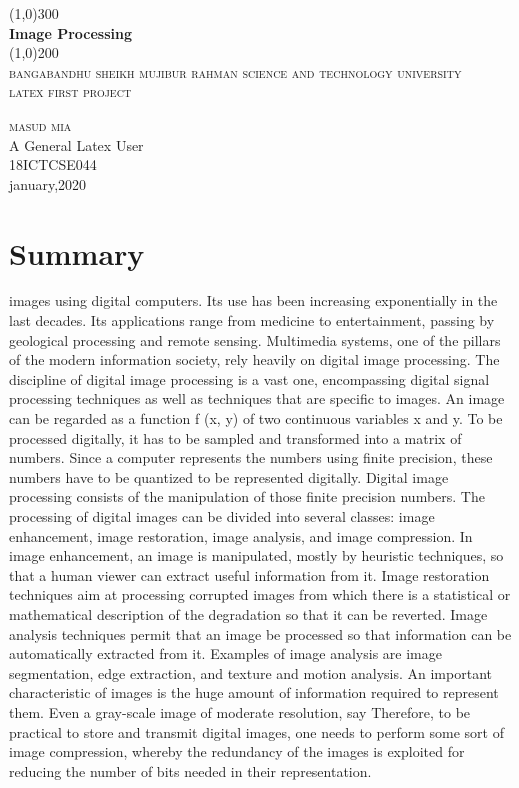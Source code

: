 \documentclass[a4paper]{article}
\begin{document}
  \begin{titlepage}
  \begin{center}
  \line(1,0){300}\\
  [.25in]
  \huge{\bfseries Image Processing}\\
  [2mm]
  \line(1,0){200}\\
  [1.5cm]
  \textsc{\LARGE bangabandhu sheikh mujibur rahman science and technology university}\\
  [.75cm]
  \textsc{\Large latex first project}\\
  [10cm]
  \end{center}
  
  \begin{flushright}
  \textsc{\huge masud mia}\\
  A General Latex User\\
  18ICTCSE044\\
  january,2020
  \end{flushright}
  \end{titlepage}
  
 \section*{Summary}
 images using digital computers. Its use has been increasing exponentially in the last decades. Its applications range from medicine to entertainment, passing by geological processing and remote sensing. Multimedia systems, one of the pillars of the modern information society, rely heavily on digital image processing.
The discipline of digital image processing is a vast one, encompassing digital signal processing techniques as well as techniques that are specific to images. An image can be regarded as a function f (x, y) of two continuous variables x and y. To be processed digitally, it has to be sampled and transformed into a matrix of numbers. Since a computer represents the numbers using finite precision, these numbers have to be quantized to be represented digitally. Digital image processing consists of the manipulation of those finite precision numbers. The processing of digital images can be divided into several classes: image enhancement, image restoration, image analysis, and image compression. In image enhancement, an image is manipulated, mostly by heuristic techniques, so that a human viewer can extract useful information from it. Image restoration techniques aim at processing corrupted images from which there is a statistical or mathematical description of the degradation so that it can be reverted. Image analysis techniques permit that an image be processed so that information can be automatically extracted from it. Examples of image analysis are image segmentation, edge extraction, and texture and motion analysis. An important characteristic of images is the huge amount of information required to represent them. Even a gray-scale image of moderate resolution, say  Therefore, to be practical to store and transmit digital images, one needs to perform some sort of image compression, whereby the redundancy of the images is exploited for reducing the number of bits needed in their representation.
\end{document}
